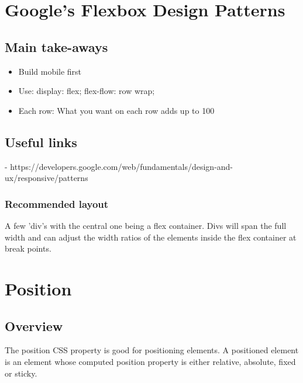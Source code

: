 \documentclass[]{article}
\newcommand{\<}{\guilsinglleft}
\renewcommand{\>}{\guilsinglright}
\begin{document}
\section{Google's Flexbox Design Patterns}
\subsection{Main take-aways}
\begin{itemize}
	\item Build mobile first 
	\item Use: 
	\subitem display: flex; 
	\subitem flex-flow: row wrap; 
	\item Each row: 
	\subitem What you want on each row adds up to 100%
\end{itemize}
\subsection{Useful links}
 - https://developers.google.com/web/fundamentals/design-and-ux/responsive/patterns
 
 \subsubsection{Recommended layout}
 A few 'div's with the central one being a flex container.  Divs will span the full width and can adjust the width ratios of the elements inside the flex container at break points.

\section{Position}
\subsection{Overview}
The position CSS property is good for positioning elements. A positioned element is an element whose computed position property is either relative, absolute, fixed or sticky. 
\end{document}
